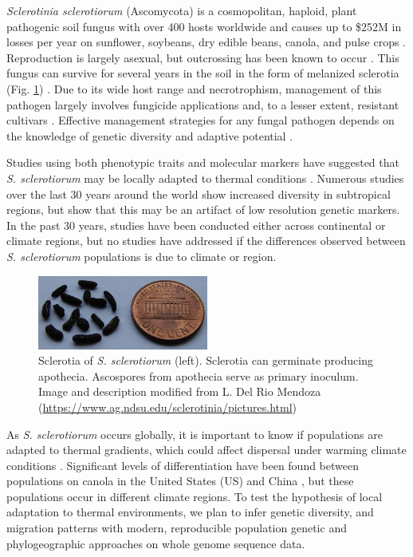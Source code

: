 \documentclass[12pt,letterpaper]{article}
\begin{document}
\textit{Sclerotinia sclerotiorum} (Ascomycota) is a cosmopolitan, haploid, plant pathogenic soil fungus with over 400 hosts worldwide \citep{bolton2006sclerotinia} and causes up to \$252M in losses per year on sunflower, soybeans, dry edible beans, canola, and pulse crops \citep{uscanola}.
Reproduction is largely asexual, but outcrossing has been known to occur \citep{bolton2006sclerotinia,attanayake2014inferring}. 
This fungus can survive for several years in the soil in the form of melanized sclerotia (Fig. \ref{fig:sclerotia}) \citep{bolton2006sclerotinia}.
Due to its wide host range and necrotrophism, management of this pathogen largely involves fungicide applications and, to a lesser extent, resistant cultivars \citep{bolton2006sclerotinia}.
Effective management strategies for any fungal pathogen depends on the knowledge of genetic diversity and adaptive potential \citep{grunwald2016population}. 

Studies using both phenotypic traits and molecular markers have suggested that \textit{S. sclerotiorum} may be locally adapted to thermal conditions \citep{huang1991temperature,carbone2001microbial}.
Numerous studies over the last 30 years around the world show increased diversity in subtropical regions, but \citet{lehner2017sclerotinia} show that this may be an artifact of low resolution genetic markers.
In the past 30 years, studies have been conducted either across continental or climate regions, but no studies have addressed if the differences observed between \textit{S. sclerotiorum} populations is due to climate or region.

\begin{figure}
  \centering
  \includegraphics[width=0.5\textwidth]{figure/sclerotia.jpg}
  \caption{Sclerotia of \textit{S. sclerotiorum} (left). Sclerotia can germinate producing apothecia. Ascospores from apothecia serve as primary inoculum. Image and description modified from L. Del Rio Mendoza (\url{https://www.ag.ndsu.edu/sclerotinia/pictures.html})}
  \label{fig:sclerotia}
\end{figure}

As \textit{S. sclerotiorum} occurs globally, it is important to know if populations are adapted to thermal gradients, which could affect dispersal under warming climate conditions \citep{bolton2006sclerotinia,lehner2017sclerotinia,croll2016genetic}.
Significant levels of differentiation have been found between populations on canola in the United States (US) and China \citep{attanayake2013sclerotinia}, but these populations occur in different climate regions.
To test the hypothesis of local adaptation to thermal environments, we plan to infer genetic diversity, and migration patterns with modern, reproducible population genetic and phylogeographic approaches on whole genome sequence data. 
\end{document}
